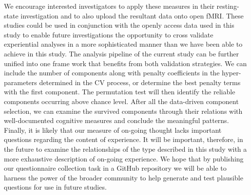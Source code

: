 We encourage interested investigators to apply these measures in their resting-state investigation and to also upload the resultant data onto open fMRI. These studies could be used in conjunction with the openly access data used in this study to enable future investigations the opportunity to cross validate experiential analyses in a more sophisticated manner than we have been able to achieve in this study. The analysis pipeline of the current study can be further unified into one frame work that benefits from both validation strategies. We can include the number of components along with penalty coefficients in the hyper-parameters determined in the CV process, or determine the best penalty terms with the first component. The permutation test will then identify the reliable components occurring above chance level. After all the data-driven component selection, we can examine the survived components through their relations with well-documented cognitive measures and conclude the meaningful patterns. Finally, it is likely that our measure of on-going thought lacks important questions regarding the content of experience. It will be important, therefore, in the future to examine the relationships of the type described in this study with a more exhaustive description of on-going experience. We hope that by publishing our questionnaire collection task in a GitHub repository we will be able to harness the power of the broader community to help generate and test plausible questions for use in future studies.

